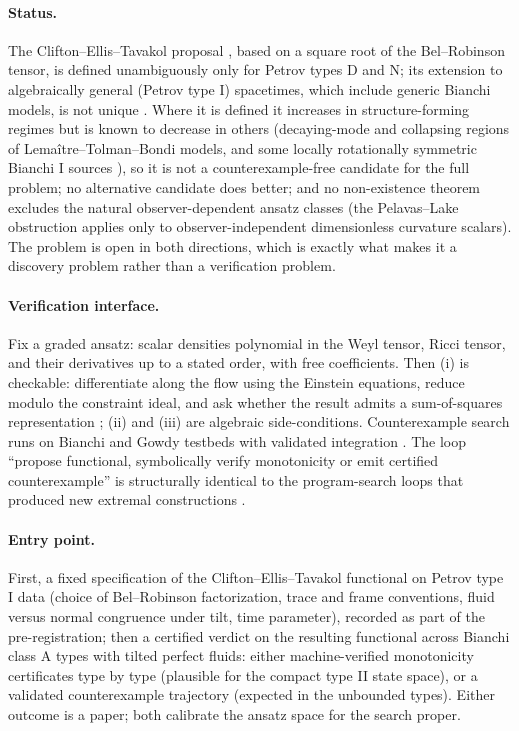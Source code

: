\documentclass[11pt,letterpaper]{article}
\begin{document}
\paragraph{Status.} The Clifton--Ellis--Tavakol proposal \cite{cet2013}, based on a square root of the Bel--Robinson tensor, is defined unambiguously only for Petrov types D and N; its extension to algebraically general (Petrov type I) spacetimes, which include generic Bianchi models, is not unique \cite{sns2026}. Where it is defined it increases in structure-forming regimes but is known to decrease in others (decaying-mode and collapsing regions of Lema\^itre--Tolman--Bondi models, and some locally rotationally symmetric Bianchi I sources \cite{sussmanlarena2014,chakraborty2021}), so it is not a counterexample-free candidate for the full problem; no alternative candidate does better; and no non-existence theorem excludes the natural observer-dependent ansatz classes (the Pelavas--Lake obstruction \cite{pelavaslake1998} applies only to observer-independent dimensionless curvature scalars). The problem is open in both directions, which is exactly what makes it a discovery problem rather than a verification problem.

\paragraph{Verification interface.} Fix a graded ansatz: scalar densities polynomial in the Weyl tensor, Ricci tensor, and their derivatives up to a stated order, with free coefficients. Then (i) is checkable: differentiate along the flow using the Einstein equations, reduce modulo the constraint ideal, and ask whether the result admits a sum-of-squares representation \cite{parrilo2003}; (ii) and (iii) are algebraic side-conditions. Counterexample search runs on Bianchi and Gowdy testbeds with validated integration \cite{arb2017}. The loop ``propose functional, symbolically verify monotonicity or emit certified counterexample'' is structurally identical to the program-search loops that produced new extremal constructions \cite{romera2024,georgiev2025}.

\paragraph{Entry point.} First, a fixed specification of the Clifton--Ellis--Tavakol functional on Petrov type I data (choice of Bel--Robinson factorization, trace and frame conventions, fluid versus normal congruence under tilt, time parameter), recorded as part of the pre-registration; then a certified verdict on the resulting functional across Bianchi class A types with tilted perfect fluids: either machine-verified monotonicity certificates type by type (plausible for the compact type II state space), or a validated counterexample trajectory (expected in the unbounded types). Either outcome is a paper; both calibrate the ansatz space for the search proper.
\end{document}
